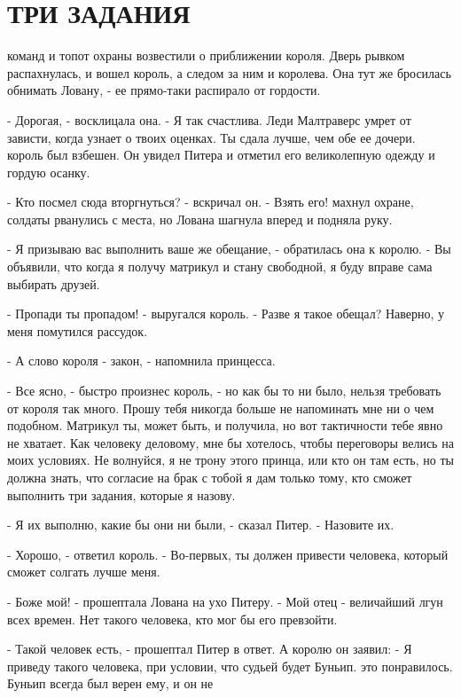 \chapter{ТРИ ЗАДАНИЯ}
\par{} команд и топот охраны возвестили о приближении короля. Дверь 
рывком распахнулась, и вошел король, а следом за ним и королева. Она 
тут же бросилась обнимать Ловану, - ее прямо-таки распирало от 
гордости.
\par- Дорогая, - восклицала она. - Я так счастлива. Леди Малтраверс 
умрет от зависти, когда узнает о твоих оценках. Ты сдала лучше, чем 
обе ее дочери.
 король был взбешен. Он увидел Питера и отметил его великолепную 
одежду и гордую осанку.
\par- Кто посмел сюда вторгнуться? - вскричал он. - Взять его!
 махнул охране, солдаты рванулись с места, но Лована шагнула 
вперед и подняла руку.
\par- Я призываю вас выполнить ваше же обещание, - обратилась она к 
королю. - Вы объявили, что когда я получу матрикул и стану свободной, 
я буду вправе сама выбирать друзей.
\par- Пропади ты пропадом! - выругался король. - Разве я такое обещал? 
Наверно, у меня помутился рассудок.
\par- А слово короля - закон, - напомнила принцесса.
\par- Все ясно, - быстро произнес король, - но как бы то ни было, 
нельзя требовать от короля так много. Прошу тебя никогда больше не 
напоминать мне ни о чем подобном. Матрикул ты, может быть, и получила, 
но вот тактичности тебе явно не хватает. Как человеку деловому, мне бы 
хотелось, чтобы переговоры велись на моих условиях. Не волнуйся, я не 
трону этого принца, или кто он там есть, но ты должна знать, что 
согласие на брак с тобой я дам только тому, кто сможет выполнить три 
задания, которые я назову.
\par- Я их выполню, какие бы они ни были, - сказал Питер. - Назовите 
их.
\par- Хорошо, - ответил король. - Во-первых, ты должен привести 
человека, который сможет солгать лучше меня.
\par- Боже мой! - прошептала Лована на ухо Питеру. - Мой отец - 
величайший лгун всех времен. Нет такого человека, кто мог бы его 
превзойти.
\par- Такой человек есть, - прошептал Питер в ответ. А королю он 
заявил: - Я приведу такого человека, при условии, что судьей будет 
Буньип.
 это понравилось. Буньип всегда был верен ему, и он не 
